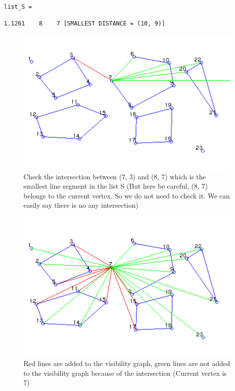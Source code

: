 \documentclass{article}
\begin{document}
\hspace{1cm}\texttt{list\_S =}

\hspace{2cm}\texttt{1.1261 \ \ \ 8 \ \ \ 7 [SMALLEST DISTANCE = (10, 9)]}

\begin{figure}[!h]
\begin{center}
\includegraphics[scale=0.9]{10}
\caption{Check the intersection between (7, 3) and (8, 7) which is the smallest line segment in the list S (But here be careful, (8, 7) belongs to the current vertex. So we do not need to check it. We can easily say there is no any intersection)}
\end{center}
\end{figure}

\begin{figure}[!h]
\begin{center}
\includegraphics[scale=0.9]{01}
\caption{Red lines are added to the visibility graph, green lines are not added to the visibility graph because of the intersection (Current vertex is 7)}
\end{center}
\end{figure}
\end{document}
